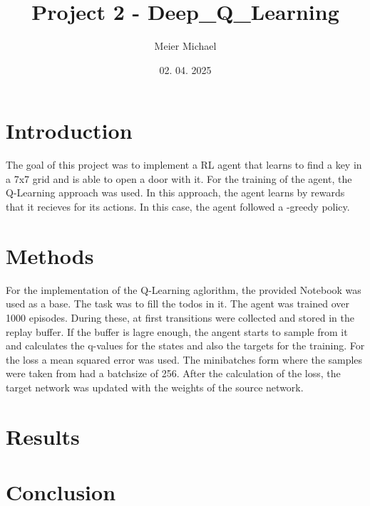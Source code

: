 \documentclass[a4paper, 9pt]{extarticle}
\title{Project 2 - Deep_Q_Learning}
\author{Meier Michael}
\date{02. 04. 2025}
\begin{document}
\maketitle

\section*{Introduction}
The goal of this project was to implement a RL agent that learns to find a key in a 7x7 grid and is able to open a door with it.
For the training of the agent, the Q-Learning approach was used. In this approach, the agent learns by rewards 
that it recieves for its actions. In this case, the agent followed a \epsilon-greedy policy. 


\section*{Methods}
For the implementation of the Q-Learning aglorithm, the provided Notebook was used as a base. The task was to fill the 
todos in it. 
The agent was trained over 1000 episodes. During these, at first transitions were collected and stored in the replay buffer. 
If the buffer is lagre enough, the angent starts to sample from it and calculates the q-values for the states and also the targets for the training.
For the loss a mean squared error was used. The minibatches form where the samples were taken from had a batchsize of 256.
After the calculation of the loss, the target network was updated with the weights of the source network.


\section*{Results}



\section*{Conclusion}
\end{document}
